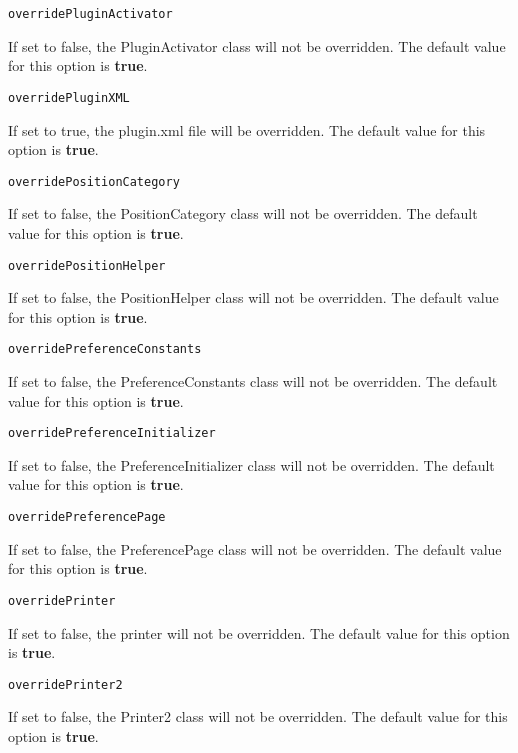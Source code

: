 \noindent\texttt{overridePluginActivator}
\begin{myindentpar}{1cm}
If set to false, the PluginActivator class will not be overridden. The default value for this option is \textbf{true}.
\end{myindentpar}

\noindent\texttt{overridePluginXML}
\begin{myindentpar}{1cm}
If set to true, the plugin.xml file will be overridden. The default value for this option is \textbf{true}.
\end{myindentpar}

\noindent\texttt{overridePositionCategory}
\begin{myindentpar}{1cm}
If set to false, the PositionCategory class will not be overridden. The default value for this option is \textbf{true}.
\end{myindentpar}

\noindent\texttt{overridePositionHelper}
\begin{myindentpar}{1cm}
If set to false, the PositionHelper class will not be overridden. The default value for this option is \textbf{true}.
\end{myindentpar}

\noindent\texttt{overridePreferenceConstants}
\begin{myindentpar}{1cm}
If set to false, the PreferenceConstants class will not be overridden. The default value for this option is \textbf{true}.
\end{myindentpar}

\noindent\texttt{overridePreferenceInitializer}
\begin{myindentpar}{1cm}
If set to false, the PreferenceInitializer class will not be overridden. The default value for this option is \textbf{true}.
\end{myindentpar}

\noindent\texttt{overridePreferencePage}
\begin{myindentpar}{1cm}
If set to false, the PreferencePage class will not be overridden. The default value for this option is \textbf{true}.
\end{myindentpar}

\noindent\texttt{overridePrinter}
\begin{myindentpar}{1cm}
If set to false, the printer will not be overridden. The default value for this option is \textbf{true}.
\end{myindentpar}

\noindent\texttt{overridePrinter2}
\begin{myindentpar}{1cm}
If set to false, the Printer2 class will not be overridden. The default value for this option is \textbf{true}.
\end{myindentpar}

